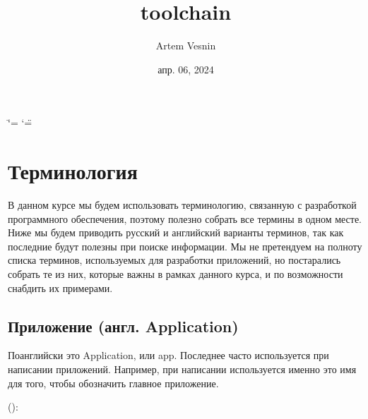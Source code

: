 \documentclass[letterpaper,10pt,russian]{sphinxmanual}
\title{toolchain}
\date{апр. 06, 2024}
\author{Artem Vesnin}
\begin{document}
\ifdefined\shorthandoff
  \ifnum\catcode`\=\string=\active\shorthandoff{=}\fi
  \ifnum\catcode`\"=\active{}\fi
\fi

\pagestyle{empty}
\sphinxmaketitle
\pagestyle{plain}
\sphinxtableofcontents
\pagestyle{normal}
\label{\detokenize{index::doc}}


\sphinxstepscope


\chapter{Терминология}
\label{\detokenize{educational_materials/terms/content:id1}}\label{\detokenize{educational_materials/terms/content::doc}}
\sphinxAtStartPar
В данном курсе мы будем использовать терминологию, связанную с разработкой программного обеспечения, поэтому полезно собрать все термины в одном месте. Ниже мы будем приводить русский и английский варианты терминов, так как последние будут полезны при поиске информации. Мы не претендуем на полноту списка терминов, используемых для разработки приложений, но постарались собрать те из них, которые важны в рамках данного курса, и по возможности снабдить их примерами.


\section{Приложение (англ. Application)}
\label{\detokenize{educational_materials/terms/content:application}}
\sphinxAtStartPar
По\sphinxhyphen{}английски это Application, или app. Последнее часто используется при написании приложений. Например, при написании  используется именно это имя для того, чтобы обозначить главное приложение.

\sphinxAtStartPar
():

\begin{sphinxVerbatim}[commandchars=\\\{\}]
   

  

  
      
\end{sphinxVerbatim}
\end{document}
